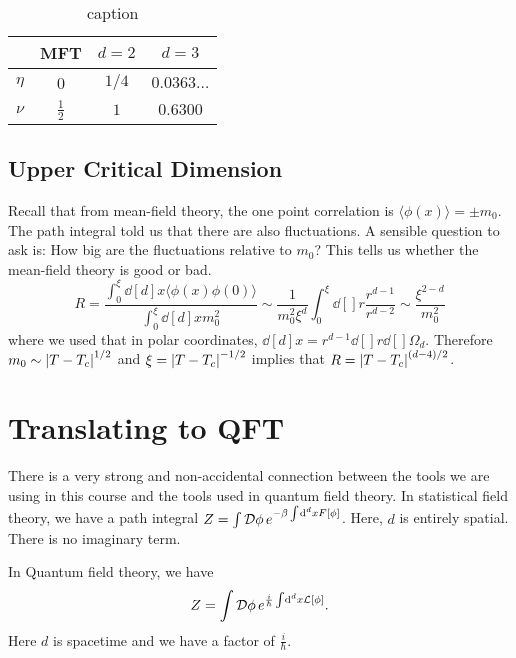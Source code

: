 \begin{table}[htpb]
  \centering
  \begin{tabular}{|c|c|c|c|}
    \hline
    & MFT & $d = 2$ & $d = 3$ \\
    \hline
    $\eta$ & 0 & ${1}/{4}$ & $0.0363\dots$ \\
    $\nu$ & $\frac{1}{2}$ & $1$ & $0.6300$ \\
    \hline
  \end{tabular}
  \caption{caption}
  \label{tab:label}
\end{table}


\subsection{Upper Critical Dimension}%
\label{sub:upper_critical_dimension}

Recall that from mean-field theory, the one point correlation is $\langle \phi(x) \rangle = \pm m_0$. The path integral told us that there are also fluctuations. 
A sensible question to ask is: How big are the fluctuations relative to $m_0$?
This tells us whether the mean-field theory is good or bad.
\begin{equation}
  R = \frac{\int_{0}^{\xi} \dd[d]{x} \langle \phi(x)\phi(0) \rangle}{\int_{0}^{\xi} \dd[d]{x} m_0^2} \sim \frac{1}{m_0^2 \xi^d} \int_{0}^{\xi} \dd[]{r} \frac{r^{d-1}}{r^{d-2}} \sim \frac{\xi^{2-d}}{m_0^2}
\end{equation}
where we used that in polar coordinates, $\dd[d]{x} = r^{d-1} \dd[]{r} \dd[]{\Omega_d}$.
Therefore $m_0 \sim \abs{T - T_c}^{1/2}$ and $\xi = \abs{T - T_c}^{-1/2}$ implies that $R = \abs{T-T_c}^{(d-4)/2}$.

\section{Translating to QFT}%
\label{sec:translating_to_qft}

There is a very strong and non-accidental connection between the tools we are using in this course and the tools used in quantum field theory.
In statistical field theory, we have a path integral $Z = \int \mathop{\mathcal{D} \phi} e^{-\beta \int_{}^{} \dd[d]{x} F[\phi]}$. Here, $d$ is entirely spatial. There is no imaginary term.

In Quantum field theory, we have
\begin{equation}
  Z = \int \mathop{\mathcal{D} \phi} e^{\frac{i}{\hbar} \int \dd[d]{x} \mathcal{L}[\phi]}.
\end{equation}
Here $d$ is spacetime and we have a factor of $\frac{i}{\hbar}$.

